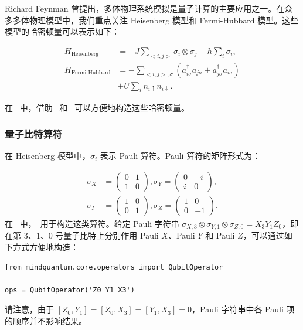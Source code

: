 Richard Feynman 曾提出，多体物理系统模拟是量子计算的主要应用之一。在众多多体物理模型中，我们重点关注 Heisenberg 模型和 Fermi-Hubbard 模型。这些模型的哈密顿量可以表示如下：

\begin{align*}
    H_\text{Heisenberg}    & = -J\sum_{<i,j>}\sigma_i\otimes \sigma_j-h\sum_i\sigma_i,                                            \\
    H_\text{Fermi-Hubbard} & = -\sum_{<i,j>,\sigma}\left(a_{i\sigma}^\dagger a_{j\sigma} + a_{j\sigma}^\dagger a_{i\sigma}\right) \\
                           & + U\sum_i n_{i\uparrow}n_{i\downarrow}.
\end{align*}

在 \MindQuantum\ 中，借助 \QubitOperator\ 和 \FermionOperator\ 可以方便地构造这些哈密顿量。

\subsubsection{量子比特算符}

在 Heisenberg 模型中，$\sigma_i$ 表示 Pauli 算符。Pauli 算符的矩阵形式为：

\begin{align*}
    \sigma_X & = \begin{pmatrix}
        0 & 1 \\
        1 & 0
    \end{pmatrix}, \sigma_Y = \begin{pmatrix}
        0 & -i \\
        i & 0
    \end{pmatrix}, \\
    \sigma_I & =\begin{pmatrix}
        1 & 0 \\
        0 & 1
    \end{pmatrix}, \sigma_Z = \begin{pmatrix}
        1 & 0  \\
        0 & -1
    \end{pmatrix}.
\end{align*}
在 \MindQuantum\ 中，\QubitOperator\ 用于构造这类算符。给定 Pauli 字符串 $\sigma_{X,3}\otimes \sigma_{Y,1}\otimes \sigma_{Z,0}=X_3 Y_1 Z_0$，即在第 3、1、0 号量子比特上分别作用 Pauli $X$、Pauli $Y$ 和 Pauli $Z$，可以通过如下方式方便地构造：

\begin{lstlisting}
from mindquantum.core.operators import QubitOperator

ops = QubitOperator('Z0 Y1 X3')
\end{lstlisting}
请注意，由于 $[Z_0, Y_1]= [Z_0,X_3] = [Y_1, X_3]=0$，Pauli 字符串中各 Pauli 项的顺序并不影响结果。

